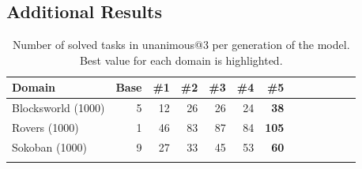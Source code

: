 \documentclass{article}
\begin{document}


\subsection{Additional Results}
\label{sec:extra-exps}


 \begin{table}[t!]
\begin{center}
\caption{Average number of solved tasks per generation of the model. Average over three runs. Total of 1000 tasks per domain. Best value for each domain is highlighted.}
\label{tab:solved}
\end{center}
\end{table}


\begin{table}[t!]
\begin{center}
\begin{tabular}{lrrrrrrrrrrcr}
\toprule
Domain             & Base & \#1 & \#2 & \#3 & \#4 & \#5          \\
\midrule
Blocksworld (1000) & 5    & 12  & 26  & 26  & 24  & \textbf{38}  \\
Rovers (1000)      & 1    & 46  & 83  & 87  & 84  & \textbf{105} \\
Sokoban (1000)     & 9    & 27  & 33  & 45  & 53  & \textbf{60}  \\
\bottomrule                                                      \\
\end{tabular}
\caption{Number of solved tasks in unanimous@3 per generation of the model. Best value for each
  domain is highlighted.}
\label{tab:unanimousn}
\end{center}
\end{table}
\end{document}

